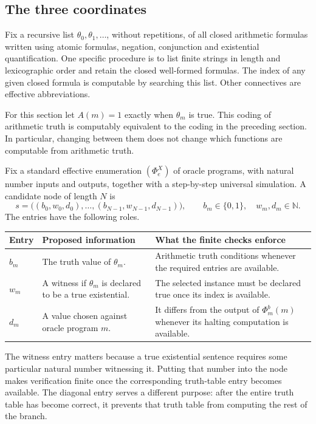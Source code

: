 \documentclass[11pt]{article}
\theoremstyle{definition}
\newcommand{\N}{\mathbb N}
\begin{document}
\subsection{The three coordinates}

Fix a recursive list $\theta_0,\theta_1,\ldots$, without repetitions, of all
closed arithmetic formulas written using atomic formulas, negation,
conjunction and existential quantification. One specific procedure is to list
finite strings in length and lexicographic order and retain the closed
well-formed formulas. The index of any given closed formula is computable by
searching this list. Other connectives are effective abbreviations.

For this section let $A(m)=1$ exactly when $\theta_m$ is true. This coding of
arithmetic truth is computably equivalent to the coding in the preceding
section. In particular, changing between them does not change which functions
are computable from arithmetic truth.

Fix a standard effective enumeration $(\Phi_e^X)$ of oracle programs, with
natural number inputs and outputs, together with a step-by-step universal
simulation. A candidate node of length $N$ is
\begin{equation}\label{eq:record}
 s=\bigl((b_0,w_0,d_0),\ldots,(b_{N-1},w_{N-1},d_{N-1})\bigr),
 \qquad b_m\in\{0,1\},\quad w_m,d_m\in\N.
\end{equation}
The entries have the following roles.

\begin{center}
\begin{tabular}{p{}p{}p{}}
\hline
Entry & Proposed information & What the finite checks enforce\\
\hline
$b_m$ & The truth value of $\theta_m$. & Arithmetic truth conditions whenever
the required entries are available.\\[3pt]
$w_m$ & A witness if $\theta_m$ is declared to be a true existential. & The
selected instance must be declared true once its index is available.\\[3pt]
$d_m$ & A value chosen against oracle program $m$. & It differs from the
output of $\Phi_m^b(m)$ whenever its halting computation is available.\\
\hline
\end{tabular}
\end{center}

The witness entry matters because a true existential sentence requires some
particular natural number witnessing it. Putting that number into the node
makes verification finite once the corresponding truth-table entry becomes
available. The diagonal entry serves a different purpose: after the entire
truth table has become correct, it prevents that truth table from computing
the rest of the branch.
\end{document}
